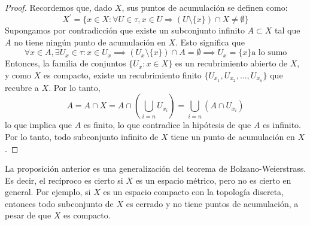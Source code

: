 \begin{proof}
    Recordemos que, dado $X$, sus puntos de acumulación se definen como: 
    $$X^{\prime} = \{x \in X : \forall U \in \tau, x \in U \Rightarrow (U \setminus \{x\}) \cap X \neq \emptyset\}$$
    Supongamos por contradicción que existe un subconjunto infinito $A \subset X$ tal que $A$ no tiene ningún punto de acumulación en $X$. Esto significa que 
    $$\forall x \in A, \exists U_x \in \tau : x \in U_x \implies (U_x \setminus \{x\}) \cap A = \emptyset \implies U_x = \{x\} \text{a lo sumo}$$
    Entonces, la familia de conjuntos $\{U_x : x \in X\}$ es un recubrimiento abierto de $X$, y como $X$ es compacto, existe un recubrimiento finito $\{U_{x_1}, U_{x_2}, \ldots, U_{x_n}\}$ que recubre a $X$. Por lo tanto, 
    $$A = A \cap X = A \cap \left(\bigcup_{i = n} U_{x_i}\right) = \bigcup_{i = n} (A \cap U_{x_i})$$
    lo que implica que $A$ es finito, lo que contradice la hipótesis de que $A$ es infinito. Por lo tanto, todo subconjunto infinito de $X$ tiene un punto de acumulación en $X$.
\end{proof}
\begin{observación}
    La proposición anterior es una generalización del teorema de Bolzano-Weierstrass. Es decir, el recíproco es cierto si $X$ es un espacio métrico, pero no es cierto en general. Por ejemplo, si $X$ es un espacio compacto con la topología discreta, entonces todo subconjunto de $X$ es cerrado y no tiene puntos de acumulación, a pesar de que $X$ es compacto.
\end{observación}
